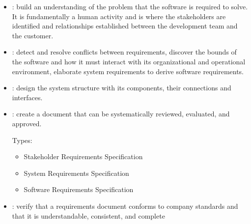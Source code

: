 \begin{itemize}
\item {}:
 build an understanding of the problem that
 the software is required to solve. It is fundamentally a human activity and is where
 the stakeholders are identified and relationships established
between the development team and the customer.
\item {}:
  detect and resolve conflicts between requirements,
  discover the bounds of the software and how
    it must interact with its organizational and operational environment,
 elaborate system requirements to derive software requirements.

%
%
\item {}: design the system structure with its components,
  their connections and interfaces.
  \newslide
\item {}: create a document that can be systematically reviewed,
  evaluated, and approved.

  Types:
\begin{itemize}
\item Stakeholder Requirements Specification
\item System Requirements Specification
\item Software Requirements Specification
\end{itemize}
%
%

\item {}:
  verify that a requirements document conforms to company standards
  and that it is understandable, consistent, and complete

\end{itemize}
